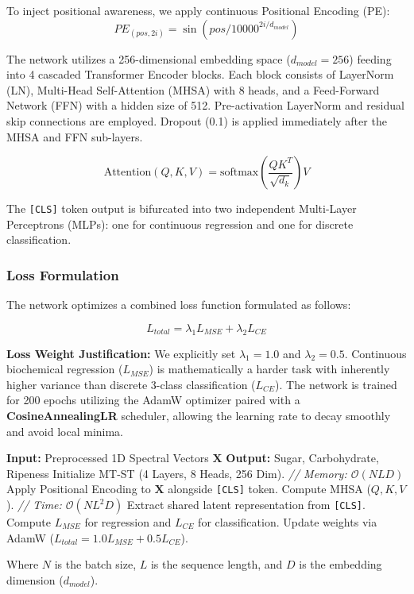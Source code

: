 \documentclass[pdflatex,sn-mathphys-num]{sn-jnl}
\begin{document}
To inject positional awareness, we apply continuous Positional Encoding (PE):
\begin{equation}
PE_{(pos, 2i)} = \sin(pos / 10000^{2i/d_{model}})
\end{equation}

The network utilizes a 256-dimensional embedding space ($d_{model}=256$) feeding into 4 cascaded Transformer Encoder blocks. Each block consists of LayerNorm (LN), Multi-Head Self-Attention (MHSA) with 8 heads, and a Feed-Forward Network (FFN) with a hidden size of 512. Pre-activation LayerNorm and residual skip connections are employed. Dropout (0.1) is applied immediately after the MHSA and FFN sub-layers.

\begin{equation}
\text{Attention}(Q, K, V) = \text{softmax}\left(\frac{QK^T}{\sqrt{d_k}}\right)V
\end{equation}

The \texttt{[CLS]} token output is bifurcated into two independent Multi-Layer Perceptrons (MLPs): one for continuous regression and one for discrete classification.

\subsubsection{Loss Formulation}

The network optimizes a combined loss function formulated as follows:

\begin{equation}
L_{total} = \lambda_1 L_{MSE} + \lambda_2 L_{CE}
\end{equation}

\textbf{Loss Weight Justification:} We explicitly set $\lambda_1 = 1.0$ and $\lambda_2 = 0.5$. Continuous biochemical regression ($L_{MSE}$) is mathematically a harder task with inherently higher variance than discrete 3-class classification ($L_{CE}$). The network is trained for 200 epochs utilizing the AdamW optimizer paired with a \textbf{CosineAnnealingLR} scheduler, allowing the learning rate to decay smoothly and avoid local minima.

\begin{algorithm}
\caption{MT-ST Prediction Algorithm}\label{algo1}
\begin{algorithmic}[1]
\State \textbf{Input:} Preprocessed 1D Spectral Vectors $\mathbf{X}$
\State \textbf{Output:} Sugar, Carbohydrate, Ripeness
\State Initialize MT-ST (4 Layers, 8 Heads, 256 Dim). \textit{// Memory: $\mathcal{O}(N L D)$}
\State Apply Positional Encoding to $\mathbf{X}$ alongside \texttt{[CLS]} token.
    \State Compute MHSA ($Q, K, V$). \textit{// Time: $\mathcal{O}(N L^2 D)$}
    \State Extract shared latent representation from \texttt{[CLS]}.
    \State Compute $L_{MSE}$ for regression and $L_{CE}$ for classification.
    \State Update weights via AdamW ($L_{total} = 1.0 L_{MSE} + 0.5 L_{CE}$).
\EndFor
\end{algorithmic}
\end{algorithm}
Where $N$ is the batch size, $L$ is the sequence length, and $D$ is the embedding dimension ($d_{model}$).
\end{document}
